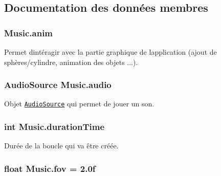 \subsection{Documentation des données membres}
\hypertarget{class_music_a79bb9b529e228f1a320b47f88ff71d45}{}
\subsubsection[{anim}]{ Music.\+anim}\label{class_music_a79bb9b529e228f1a320b47f88ff71d45}


Permet d\textquotesingle{}intéragir avec la partie graphique de l\textquotesingle{}application (ajout de sphères/cylindre, animation des objets ...). 

\hypertarget{class_music_af7e21d12bd49e617d8c66bbd548f658b}{}
\subsubsection[{audio}]{\setlength{\rightskip}{0pt plus 5cm}Audio\+Source Music.\+audio}\label{class_music_af7e21d12bd49e617d8c66bbd548f658b}


Objet \href{http://docs.unity3d.com/ScriptReference/AudioSource.html}{\tt Audio\+Source} qui permet de jouer un son. 

\hypertarget{class_music_a477118c7507d4eca7c99d5d431e91ddd}{}
\subsubsection[{duration\+Time}]{\setlength{\rightskip}{0pt plus 5cm}int Music.\+duration\+Time\hspace{0.3cm}{\ttfamily [private]}}\label{class_music_a477118c7507d4eca7c99d5d431e91ddd}


Durée de la boucle qui va être créée. 

\hypertarget{class_music_adf1ab3cb19a41e9e4eed57e41a420426}{}
\subsubsection[{fov}]{\setlength{\rightskip}{0pt plus 5cm}float Music.\+fov = 2.\+0f\hspace{0.3cm}{\ttfamily [private]}}\label{class_music_adf1ab3cb19a41e9e4eed57e41a420426}


